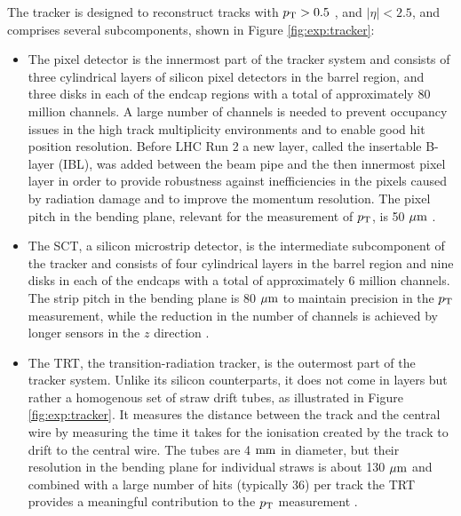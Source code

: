 The tracker is designed to reconstruct tracks with $p_{\text{T}} > 0.5$ \GeV, and
$|\eta| < 2.5$, and comprises several subcomponents, shown in Figure
\ref{fig:exp:tracker}:
\begin{itemize}
\item The pixel detector is the innermost part of the tracker system and
consists of three cylindrical layers of silicon pixel detectors in the
barrel region, and three disks in each of the endcap regions with a total of
approximately 80 million channels. A large number of channels is needed
to prevent occupancy issues in the high track multiplicity environments
and to enable good hit position resolution. Before LHC Run 2 a new layer,
called the insertable B-layer (IBL), was added between the beam pipe and the
then innermost pixel layer in order to provide robustness against
inefficiencies in the pixels caused by radiation damage and to improve
the momentum resolution. The pixel pitch in the bending plane, relevant for the
measurement of $p_{\text{T}}$, is 50 $\mu\text{m}$ \cite{CERN-LHCC-97-016, Aad:2008zzm, Capeans:1291633}. 
\item The SCT, a silicon microstrip detector, is the intermediate subcomponent
of the tracker and consists of four cylindrical layers in the barrel region
and nine disks in each of the endcaps with a total of approximately 6 million
channels. The strip pitch in the bending plane is 80 $\mu\text{m}$ to maintain
precision in the $p_{\text{T}}$ measurement, while the reduction in the number of
channels is achieved by longer sensors in the $z$ direction \cite{CERN-LHCC-97-016, Aad:2008zzm}.
\item The TRT, the transition-radiation tracker, is the outermost part of the
tracker system. Unlike its silicon counterparts, it does not come in layers
but rather a homogenous set of straw drift tubes, as illustrated in
Figure \ref{fig:exp:tracker}. It measures the distance between the track
and the central wire by measuring the time it takes for the ionisation
created by the track to drift to the central wire. The tubes are 4 $\text{mm}$
in diameter, but their resolution in the bending plane for individual
straws is about 130 $\mu\text{m}$ and combined with a large number of hits (typically 36)
per track the TRT provides a meaningful contribution to the
$p_{\text{T}}$ measurement \cite{CERN-LHCC-97-016, Aad:2008zzm}.
\end{itemize}

